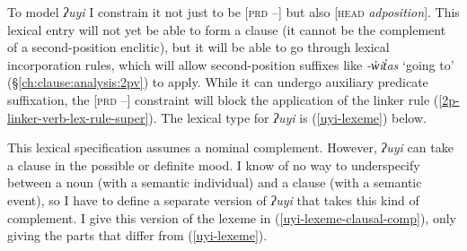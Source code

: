 To model \textit{ʔuyi} I constrain it not just to be [\textsc{prd} --] but also [\textsc{head} \textit{adposition}]. This lexical entry will not yet be able to form a clause (it cannot be the complement of a second-position enclitic), but it will be able to go through lexical incorporation rules, which will allow second-position suffixes like \textit{-w̓it̓as} `going to' (\S\ref{ch:clause:analysis:2pv}) to apply. While it can undergo auxiliary predicate suffixation, the [\textsc{prd} --] constraint will block the application of the linker rule (\ref{2p-linker-verb-lex-rule-super}). The lexical type for \textit{ʔuyi} is (\ref{uyi-lexeme}) below.

\vspace{-25pt}

\begin{singlespacing}
\ex \label{uyi-lexeme}
\xe
\end{singlespacing}

This lexical specification assumes a nominal complement. However, \textit{ʔuyi} can take a clause in the possible or definite mood. I know of no way to underspecify between a noun (with a semantic individual) and a clause (with a semantic event), so I have to define a separate version of \textit{ʔuyi} that takes this kind of complement. I give this version of the lexeme in (\ref{uyi-lexeme-clausal-comp}), only giving the parts that differ from (\ref{uyi-lexeme}).

